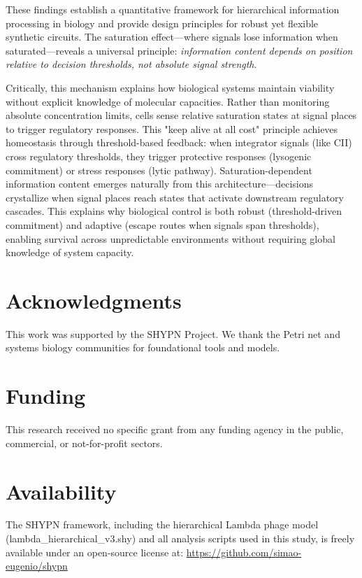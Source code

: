 \documentclass[10pt,twocolumn]{article}
\begin{document}
These findings establish a quantitative framework for hierarchical information processing in biology and provide design principles for robust yet flexible synthetic circuits. The saturation effect—where signals lose information when saturated—reveals a universal principle: \textit{information content depends on position relative to decision thresholds, not absolute signal strength}.

Critically, this mechanism explains how biological systems maintain viability without explicit knowledge of molecular capacities. Rather than monitoring absolute concentration limits, cells sense relative saturation states at signal places to trigger regulatory responses. This "keep alive at all cost" principle achieves homeostasis through threshold-based feedback: when integrator signals (like CII) cross regulatory thresholds, they trigger protective responses (lysogenic commitment) or stress responses (lytic pathway). Saturation-dependent information content emerges naturally from this architecture—decisions crystallize when signal places reach states that activate downstream regulatory cascades. This explains why biological control is both robust (threshold-driven commitment) and adaptive (escape routes when signals span thresholds), enabling survival across unpredictable environments without requiring global knowledge of system capacity.

\section*{Acknowledgments}

This work was supported by the SHYPN Project. We thank the Petri net and systems biology communities for foundational tools and models.

\section*{Funding}

This research received no specific grant from any funding agency in the public, commercial, or not-for-profit sectors.

\section*{Availability}

The SHYPN framework, including the hierarchical Lambda phage model (lambda\_hierarchical\_v3.shy) and all analysis scripts used in this study, is freely available under an open-source license at: \url{https://github.com/simao-eugenio/shypn}
\end{document}
